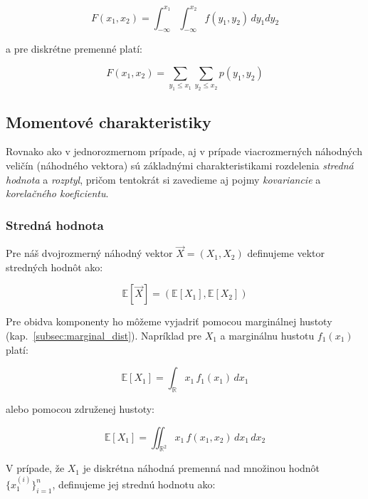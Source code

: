 \begin{equation}
F(x_1, x_2) = \int_{-\infty}^{x_1} \int_{-\infty}^{x_2} f(y_1, y_2) \, dy_1 dy_2
\end{equation}

a pre diskrétne premenné platí:

\begin{equation}
    F(x_1,x_2) = \sum_{y_1\leq x_1}\sum_{y_2\leq x_2} p(y_1,y_2)
\end{equation}

\subsection{Momentové charakteristiky}\label{joint_moments}

Rovnako ako v jednorozmernom prípade, aj v prípade viacrozmerných náhodných veličín (náhodného vektora) sú základnými charakteristikami rozdelenia \textit{stredná hodnota} a \textit{rozptyl}, pričom tentokrát si zavedieme aj pojmy \textit{kovariancie} a \textit{korelačného koeficientu}.

\subsubsection{Stredná hodnota}\label{subsubsec:joint_mean}

Pre náš dvojrozmerný náhodný vektor \(\vec{X} = (X_1, X_2)\) definujeme vektor stredných hodnôt ako:

\begin{equation}
\mathbb{E}[\vec{X}] = \left( \mathbb{E}[X_1], \mathbb{E}[X_2] \right)
\end{equation}

Pre obidva komponenty ho môžeme vyjadriť pomocou marginálnej hustoty (kap.~\ref{subsec:marginal_dist}). Napríklad pre \(X_1\) a marginálnu hustotu \(f_1(x_1)\) platí:

\begin{equation}
\mathbb{E}[X_1] = \int_{\mathbb{R}} x_1 \, f_1(x_1) \, dx_1
\end{equation}

alebo pomocou združenej hustoty:

\begin{equation}
\mathbb{E}[X_1] = \iint_{\mathbb{R}^2} x_1 \, f(x_1, x_2) \, dx_1 \, dx_2
\end{equation}

V prípade, že \(X_1\) je diskrétna náhodná premenná nad množinou hodnôt \(\{x_1^{(i)}\}_{i=1}^{n}\), definujeme jej strednú hodnotu ako:

